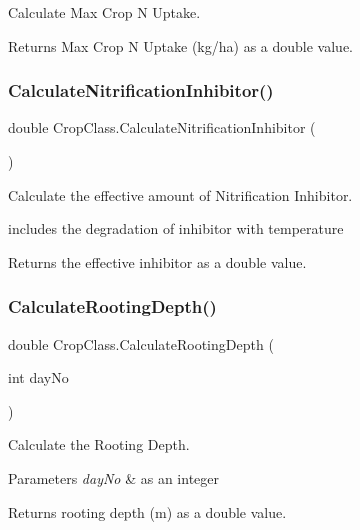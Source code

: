 Calculate Max Crop N Uptake. 

\begin{DoxyReturn}{Returns}
Max Crop N Uptake (kg/ha) as a double value. 
\end{DoxyReturn}
\mbox{\label{class_crop_class_a331622d69775779cd0865a7ee675f8cd}} 
\subsubsection{\texorpdfstring{CalculateNitrificationInhibitor()}{CalculateNitrificationInhibitor()}}
{\footnotesize\ttfamily double Crop\+Class.\+Calculate\+Nitrification\+Inhibitor (\begin{DoxyParamCaption}{ }\end{DoxyParamCaption})\hspace{0.3cm}{\ttfamily [inline]}}



Calculate the effective amount of Nitrification Inhibitor. 

includes the degradation of inhibitor with temperature \begin{DoxyReturn}{Returns}
the effective inhibitor as a double value. 
\end{DoxyReturn}
\mbox{\label{class_crop_class_ac0fd8bf1d136cdfdc45a9e28fdfa4e1e}} 
\subsubsection{\texorpdfstring{CalculateRootingDepth()}{CalculateRootingDepth()}}
{\footnotesize\ttfamily double Crop\+Class.\+Calculate\+Rooting\+Depth (\begin{DoxyParamCaption}\item[{int}]{day\+No }\end{DoxyParamCaption})\hspace{0.3cm}{\ttfamily [inline]}}



Calculate the Rooting Depth. 


\begin{DoxyParams}{Parameters}
{\em day\+No} & as an integer \\
\hline
\end{DoxyParams}
\begin{DoxyReturn}{Returns}
rooting depth (m) as a double value. 
\end{DoxyReturn}
\mbox{\label{class_crop_class_a5cf7e8ffac0a2f538ea86d148a2cc5cc}} 
